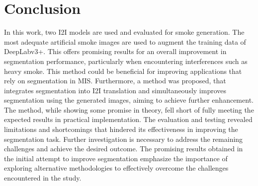 \section{Conclusion}
In this work, two I2I models are used and evaluated for smoke generation.
The most adequate artificial smoke images are used to augment the training data of DeepLabv3+.
This offers promising results for an overall improvement in segmentation performance, particularly when encountering interferences such as heavy smoke.
This method could be beneficial for improving applications that rely on segmentation in MIS.
Furthermore, a method was proposed, that integrates segmentation into I2I translation and simultaneously improves segmentation using the generated images, aiming to achieve further enhancement.
The method, while showing some promise in theory, fell short of fully meeting the expected results in practical implementation.
The evaluation and testing revealed limitations and shortcomings that hindered its effectiveness in improving the segmentation task. 
Further investigation is necessary to address the remaining challenges and achieve the desired outcome. 
The promising results obtained in the initial attempt to improve segmentation emphasize the importance of exploring alternative methodologies to effectively overcome the challenges encountered in the study.